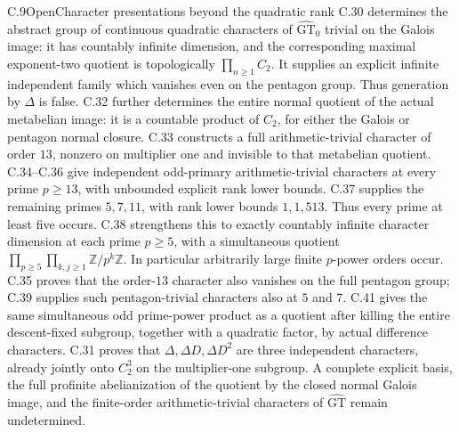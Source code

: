 \begin{statement}{C.9}{Open}{Character presentations beyond the quadratic rank}
C.30 determines the abstract group of continuous quadratic characters of
$\widehat{\mathrm{GT}}_0$ trivial on the Galois image: it has countably
infinite dimension, and the corresponding maximal exponent-two quotient
is topologically $\prod_{n\geq1}C_2$. It supplies an explicit infinite
independent family which vanishes even on the pentagon group. Thus
generation by $\Delta$ is false. C.32 further determines the entire
normal quotient of the actual metabelian image: it is a countable
product of $C_2$, for either the Galois or pentagon normal closure.
C.33 constructs a full arithmetic-trivial character of order
$13$, nonzero on multiplier one and invisible to that metabelian
quotient.
C.34--C.36 give independent odd-primary arithmetic-trivial
characters at every prime $p\geq13$, with unbounded explicit
rank lower bounds.
C.37 supplies the remaining primes $5,7,11$, with rank
lower bounds $1,1,513$.  Thus every prime at least five occurs.
C.38 strengthens this to exactly countably infinite character
dimension at each prime $p\geq5$, with a simultaneous quotient
$\prod_{p\geq5}\prod_{k,j\geq1}\mathbb Z/p^k\mathbb Z$.
In particular arbitrarily large finite $p$-power orders occur.
C.35 proves that the order-$13$ character also vanishes on the
full pentagon group; C.39 supplies such pentagon-trivial
characters also at $5$ and $7$.
C.41 gives the same simultaneous odd prime-power product as a
quotient after killing the entire descent-fixed subgroup, together
with a quadratic factor, by actual difference characters.
C.31 proves that $\Delta,\Delta D,\Delta D^2$ are three
independent characters, already jointly onto $C_2^3$ on the
multiplier-one subgroup.
A complete explicit basis, the full profinite abelianization of the quotient by the closed normal Galois
image, and the finite-order arithmetic-trivial characters of
$\widehat{\mathrm{GT}}$ remain undetermined.
\end{statement}
